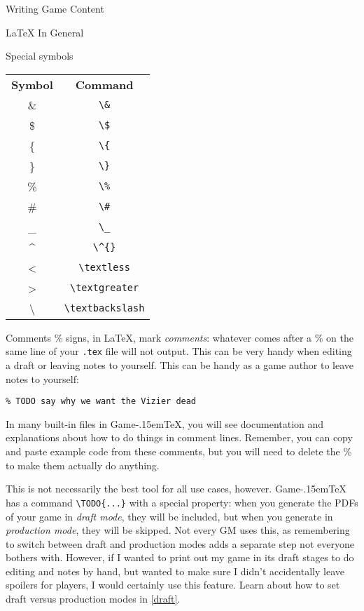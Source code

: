 \documentclass[11pt]{article}
\def\gametex{\mbox{Game\kern-.15em\TeX}}
\begin{document}
\begin{section}{Writing Game Content}
\begin{subsection}{\LaTeX{} In General}
\begin{subsubsection}{Special symbols}
\begin{tabular}{c c}
 \textbf{Symbol} & \textbf{Command} \\
 \& & \lstinline|\&| \\
 \$ & \lstinline|\$| \\
 \{ & \lstinline|\{| \\
 \} & \lstinline|\}| \\
 \% & \lstinline|\%| \\
 \# & \lstinline|\#| \\
 \_ & \lstinline|\_| \\
 \^{} & \lstinline|\^{}| \\
 \textless & \lstinline|\textless| \\
 \textgreater & \lstinline|\textgreater| \\
 \textbackslash & \lstinline|\textbackslash|
\end{tabular}
\end{subsubsection}
\begin{subsubsection}{Comments}
\% signs, in \LaTeX{}, mark \textit{comments}: whatever comes after a \% on the same line of your \texttt{.tex} file will not output.  This can be very handy when editing a draft or leaving notes to yourself.
This can be handy as a game author to leave notes to yourself:
\begin{verbatim}
% TODO say why we want the Vizier dead
\end{verbatim}
In many built-in files in \gametex{}, you will see documentation and explanations about how to do things in comment lines.  Remember, you can copy and paste example code from these comments, but you will need to delete the \% to make them actually do anything.

This is not necessarily the best tool for all use cases, however.  \gametex{} has a command \lstinline|\TODO{...}| with a special property: when you generate the PDFs of your game in \emph{draft mode}, they will be included, but when you generate in \emph{production mode}, they will be skipped.  Not every GM uses this, as remembering to switch between draft and production modes adds a separate step not everyone bothers with.  However, if I wanted to print out my game in its draft stages to do editing and notes by hand, but wanted to make sure I didn't accidentally leave spoilers for players, I would certainly use this feature.  Learn about how to set draft versus production modes in \ref{draft}.
\end{subsubsection}
\end{subsection}
\end{section}
\end{document}
